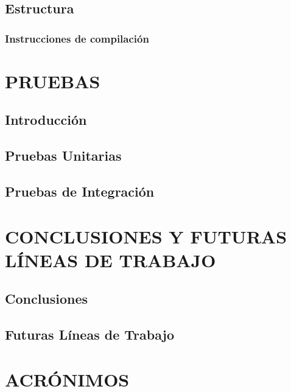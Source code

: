 \documentclass[12pt, a4paper, twoside]{book}
\begin{document}
	\section{Estructura}
	
	\subsection{Instrucciones de compilación}
	
	\chapter{PRUEBAS}
	\section{Introducción}
	
	\section{Pruebas Unitarias}

	\section{Pruebas de Integración}
	
	\chapter{CONCLUSIONES Y FUTURAS LÍNEAS DE TRABAJO}
	\section{Conclusiones}
	
	\section{Futuras Líneas de Trabajo}
	
	\renewcommand{\bibname}{Enlaces de interés}
	\begin{thebibliography}{99}

	\end{thebibliography}
	\chapter{ACRÓNIMOS}
\end{document}
